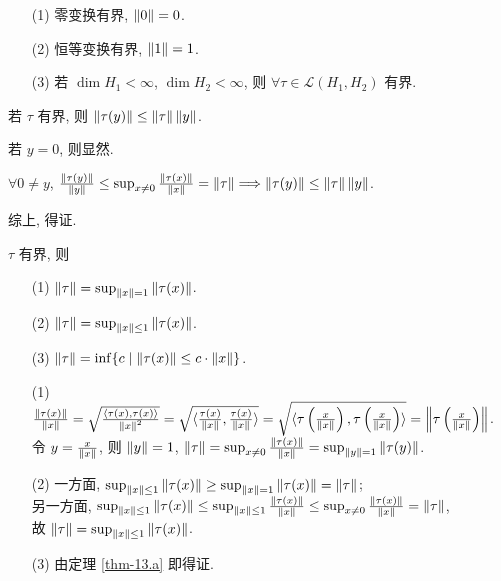 \documentclass{note}
\begin{document}
\begin{eg}
    \begin{itemize}
        \item[(1)] 零变换有界, $\left\lVert0\right\rVert=0$.
        \item[(2)] 恒等变换有界, $\left\lVert1\right\rVert=1$.
        \item[(3)] 若 $\dim H_1<\infty$, $\dim H_2<\infty$, 则 $\forall\tau\in\mathcal{L}(H_1,H_2)$ 有界.
    \end{itemize}
\end{eg}

\begin{thm}\label{thm-13.a}
    若 $\tau$ 有界, 则 $\left\lVert\tau(y)\right\rVert\leq\left\lVert\tau\right\rVert\left\lVert y\right\rVert$.
\end{thm}
\begin{pf}
    若 $y=0$, 则显然.

    $\forall 0\neq y$, $\frac{\left\lVert\tau(y)\right\rVert}{\left\lVert y\right\rVert}\leq\sup_{x\neq 0}\frac{\left\lVert\tau(x)\right\rVert}{\left\lVert x\right\rVert}=\left\lVert\tau\right\rVert\Longrightarrow\left\lVert\tau(y)\right\rVert\leq\left\lVert\tau\right\rVert\left\lVert y\right\rVert$.

    综上, 得证.
\end{pf}

\begin{thm}[(课本定理 13.30)]
    $\tau$ 有界, 则
    \begin{itemize}
        \item[(1)] $\left\lVert\tau\right\rVert=\sup_{\left\lVert x\right\rVert=1}\left\lVert\tau(x)\right\rVert$.
        \item[(2)] $\left\lVert\tau\right\rVert=\sup_{\left\lVert x\right\rVert\leq 1}\left\lVert\tau(x)\right\rVert$.
        \item[(3)] $\left\lVert\tau\right\rVert=\inf\{c\mid\left\lVert\tau(x)\right\rVert\leq c\cdot\left\lVert x\right\rVert\}$.
    \end{itemize}
\end{thm}
\begin{pf}
    \begin{itemize}
        \item[(1)] $\frac{\left\lVert\tau(x)\right\rVert}{\left\lVert x\right\rVert}=\sqrt{\frac{\langle\tau(x),\tau(x)\rangle}{\left\lVert x\right\rVert^2}}=\sqrt{\langle\frac{\tau(x)}{\left\lVert x\right\rVert},\frac{\tau(x)}{\left\lVert x\right\rVert}\rangle}=\sqrt{\langle\tau\left(\frac{x}{\left\lVert x\right\rVert}\right),\tau\left(\frac{x}{\left\lVert x\right\rVert}\right)\rangle}=\left\lVert\tau\left(\frac{x}{\left\lVert x\right\rVert}\right)\right\rVert$.\\
        令 $y=\frac{x}{\left\lVert x\right\rVert}$, 则 $\left\lVert y\right\rVert=1$, $\left\lVert\tau\right\rVert=\sup_{x\neq 0}\frac{\left\lVert\tau(x)\right\rVert}{\left\lVert x\right\rVert}=\sup_{\left\lVert y\right\rVert=1}\left\lVert\tau(y)\right\rVert$.
        \item[(2)] 一方面, $\sup_{\left\lVert x\right\rVert\leq 1}\left\lVert\tau(x)\right\rVert\geq\sup_{\left\lVert x\right\rVert=1}\left\lVert\tau(x)\right\rVert=\left\lVert\tau\right\rVert$;\\
        另一方面, $\sup_{\left\lVert x\right\rVert\leq 1}\left\lVert\tau(x)\right\rVert\leq\sup_{\left\lVert x\right\rVert\leq 1}\frac{\left\lVert\tau(x)\right\rVert}{\left\lVert x\right\rVert}\leq\sup_{x\neq 0}\frac{\left\lVert\tau(x)\right\rVert}{\left\lVert x\right\rVert}=\left\lVert\tau\right\rVert$,\\
        故 $\left\lVert\tau\right\rVert=\sup_{\left\lVert x\right\rVert\leq 1}\left\lVert\tau(x)\right\rVert$.
        \item[(3)] 由定理 \ref{thm-13.a} 即得证.
    \end{itemize}
\end{pf}
\end{document}
